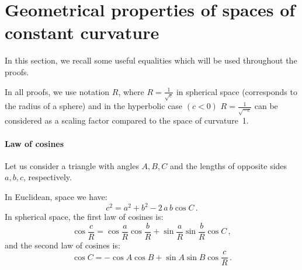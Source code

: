\documentclass{article} %
\newcommand{\lt}[1]{\textcolor{red}{#1}}
\begin{document}






\appendix

\section{Geometrical properties of spaces of constant curvature}\label{sec:properties}

In this section, we recall some useful equalities which will be used throughout the proofs.

In all proofs, we use notation $R$, where $R = \frac{1}{\sqrt{c}}$ in spherical space (corresponds to the radius of a sphere) and in the hyperbolic case $(c < 0)$ $R = \frac{1}{\sqrt{-c}}$ can be considered as a scaling factor compared to the space of curvature~1.

\paragraph{Law of cosines}

Let us consider a triangle with angles $A, B, C$ and the lengths of opposite sides $a, b, c$, respectively.

In Euclidean, space we have:
\[
c^2 = a^2 + b^2 - 2 \, a\, b \cos C\,.
\]
In spherical space, the first law of cosines is:
\[
\cos \frac{c}{R} =\cos \frac{a}{R} \cos \frac{b}{R} + \sin \frac{a}{R}\sin \frac{b}{R}\cos C \,,
\]
and the second law of cosines is:
\[
\cos C=-\cos A\cos B+\sin A\sin B\cos \frac{c}{R}\,.
\]
\end{document}
